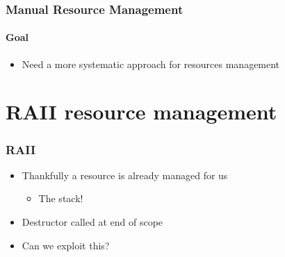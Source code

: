 \begin{frame}[fragile]
    \frametitle{Manual Resource Management}
    \framesubtitle{Goal}
    \begin{itemize}
            \begin{exampleblock}{}
                ``Make interfaces easy to use correctly and hard to use incorrectly.''
                \\*\hspace*{}
            \end{exampleblock}
        \item Need a more systematic approach for resources management
    \end{itemize}
\end{frame}




\section{RAII resource management}
\frame{\sectionpage}

\begin{frame}
    \frametitle{RAII}
    \begin{itemize}
        \item<1->Thankfully a resource is already managed for us
            \begin{itemize}
                \item<2->The stack!
            \end{itemize}
        \item<2->Destructor called at end of scope
        \item<2->Can we exploit this?
    \end{itemize}
\end{frame}

